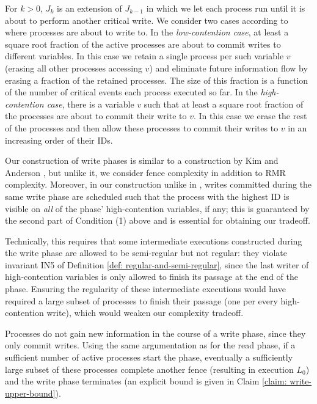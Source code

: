 For $k>0$, $J_k$ is an extension of $J_{k-1}$ in which we let each process run until it is about to perform another critical write. We consider two cases according to where processes are about to write to. In the \emph{low-contention case}, at least a square root fraction of the active processes are about to commit writes to different variables. In this case we retain a single process per such variable $v$ (erasing all other processes accessing $v$) and eliminate future information flow by erasing a fraction of the retained processes. The size of this fraction is a function of the number of critical events each process executed so far. In the \emph{high-contention case}, there is a variable $v$ such that at least a square root fraction of the processes are about to commit their write to $v$. In this case we erase the rest of the processes and then allow these processes to commit their writes to $v$ in an increasing order of their IDs.

Our construction of write phases is similar to a construction by Kim and Anderson \cite{DBLP:journals/dc/KimA12}, but unlike it, we consider fence complexity in addition to RMR complexity. Moreover, in our construction unlike in \cite{DBLP:journals/dc/KimA12}, writes committed during the same write phase are scheduled such that the process with the highest ID is visible on \textit{all} of the phase' high-contention variables, if any; this is guaranteed by the second part of Condition (1) above and is essential for obtaining our tradeoff.

Technically, this requires that some intermediate executions constructed during the write phase are allowed to be semi-regular but not regular: they violate invariant IN5 of Definition \ref{def: regular-and-semi-regular}, since the last writer of high-contention variables is only allowed to finish its passage at the end of the phase. Ensuring the regularity of these intermediate executions would have required a large subset of processes to finish their passage (one per every high-contention write), which would weaken our complexity tradeoff.

Processes do not gain new information in the course of a write phase, since they only commit writes. Using the same argumentation as for the read phase, if a sufficient number of active processes start the phase, eventually a sufficiently large subset of these processes complete another fence (resulting in execution $L_0$) and the write phase terminates (an explicit bound is given in Claim
\ref{claim: write-upper-bound}).

